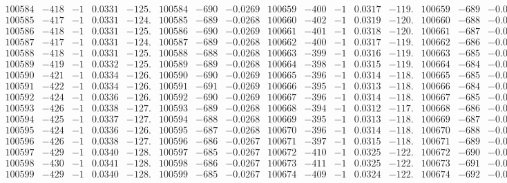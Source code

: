 \documentclass[11pt,reqno,a4letter]{article}
\numberwithin{figure}{section}
\numberwithin{table}{section}
\theoremstyle{plain}
\numberwithin{theorem}{section}
\theoremstyle{definition}
\begin{document}
\begin{table}[ht!]
\begin{equation*}
{\begin{array}{ccccc|ccc||ccccc|ccc}
100584 & -418 & -1 & 0.0331 & -125. & 100584 & -690 & -0.0269 & 100659 & -400 & -1 & 0.0317 & -119. & 100659 & -689 & -0.0268  \\
100585 & -417 & -1 & 0.0331 & -124. & 100585 & -689 & -0.0268 & 100660 & -402 & -1 & 0.0319 & -120. & 100660 & -688 & -0.0268  \\
100586 & -418 & -1 & 0.0331 & -125. & 100586 & -690 & -0.0269 & 100661 & -401 & -1 & 0.0318 & -120. & 100661 & -687 & -0.0267  \\
100587 & -417 & -1 & 0.0331 & -124. & 100587 & -689 & -0.0268 & 100662 & -400 & -1 & 0.0317 & -119. & 100662 & -686 & -0.0267  \\
100588 & -418 & -1 & 0.0331 & -125. & 100588 & -688 & -0.0268 & 100663 & -399 & -1 & 0.0316 & -119. & 100663 & -685 & -0.0267  \\
100589 & -419 & -1 & 0.0332 & -125. & 100589 & -689 & -0.0268 & 100664 & -398 & -1 & 0.0315 & -119. & 100664 & -684 & -0.0266  \\
100590 & -421 & -1 & 0.0334 & -126. & 100590 & -690 & -0.0269 & 100665 & -396 & -1 & 0.0314 & -118. & 100665 & -685 & -0.0267  \\
100591 & -422 & -1 & 0.0334 & -126. & 100591 & -691 & -0.0269 & 100666 & -395 & -1 & 0.0313 & -118. & 100666 & -684 & -0.0266  \\
100592 & -424 & -1 & 0.0336 & -126. & 100592 & -690 & -0.0269 & 100667 & -396 & -1 & 0.0314 & -118. & 100667 & -685 & -0.0267  \\
100593 & -426 & -1 & 0.0338 & -127. & 100593 & -689 & -0.0268 & 100668 & -394 & -1 & 0.0312 & -117. & 100668 & -686 & -0.0267  \\
100594 & -425 & -1 & 0.0337 & -127. & 100594 & -688 & -0.0268 & 100669 & -395 & -1 & 0.0313 & -118. & 100669 & -687 & -0.0267  \\
100595 & -424 & -1 & 0.0336 & -126. & 100595 & -687 & -0.0268 & 100670 & -396 & -1 & 0.0314 & -118. & 100670 & -688 & -0.0268  \\
100596 & -426 & -1 & 0.0338 & -127. & 100596 & -686 & -0.0267 & 100671 & -397 & -1 & 0.0315 & -118. & 100671 & -689 & -0.0268  \\
100597 & -429 & -1 & 0.0340 & -128. & 100597 & -685 & -0.0267 & 100672 & -410 & -1 & 0.0325 & -122. & 100672 & -690 & -0.0268  \\
100598 & -430 & -1 & 0.0341 & -128. & 100598 & -686 & -0.0267 & 100673 & -411 & -1 & 0.0325 & -122. & 100673 & -691 & -0.0269  \\
100599 & -429 & -1 & 0.0340 & -128. & 100599 & -685 & -0.0267 & 100674 & -409 & -1 & 0.0324 & -122. & 100674 & -692 & -0.0269  \\

\end{array}}
\end{equation*}
\end{table}
\end{document}
